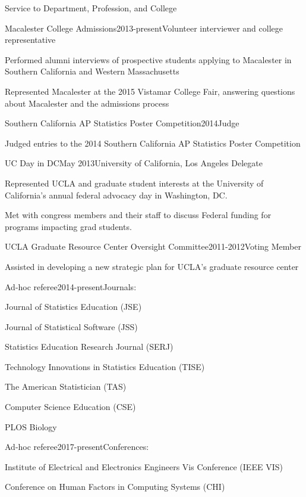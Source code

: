 \documentclass{resume} %
\begin{document}
\begin{rSection}{Service to Department, Profession, and College}
\begin{rSubsection}{Macalester College Admissions}{}{2013-present}{Volunteer interviewer and college representative}
\item Performed alumni interviews of prospective students applying to Macalester in Southern California and Western Massachusetts 
\item Represented Macalester at the 2015 Vistamar College Fair, answering questions about Macalester and the admissions process
\end{rSubsection}

\begin{rSubsection}{Southern California AP Statistics Poster Competition}{}{2014}{Judge}
\item Judged entries to the 2014 Southern California AP Statistics Poster Competition
\end{rSubsection}

\begin{rSubsection}{UC Day in DC}{}{May 2013}{University of California, Los Angeles Delegate}
\item Represented UCLA and graduate student interests at the University of California's annual federal advocacy day in Washington, DC. 
\item Met with congress members and their staff to discuss Federal funding for programs impacting grad students. 
\end{rSubsection}

\begin{rSubsection}{UCLA Graduate Resource Center Oversight Committee}{}{2011-2012}{Voting Member}
\item Assisted in developing a new strategic plan for UCLA's graduate resource center
\end{rSubsection}


\begin{rSubsection}{Ad-hoc referee}{}{2014-present}{Journals:}
\item Journal of Statistics Education (JSE)
\item Journal of Statistical Software (JSS)
\item Statistics Education Research Journal (SERJ)
\item Technology Innovations in Statistics Education (TISE)
\item The American Statistician (TAS)
\item Computer Science Education (CSE)
\item PLOS Biology 
\end{rSubsection}

\begin{rSubsection}{Ad-hoc referee}{}{2017-present}{Conferences: }
\item Institute of Electrical and Electronics Engineers Vis Conference (IEEE VIS)
\item Conference on Human Factors in Computing Systems (CHI)
\end{rSubsection}

\end{rSection}
\end{document}
